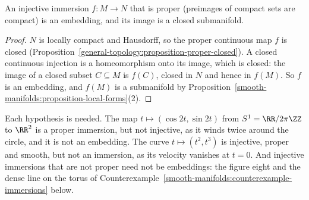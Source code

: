 \begin{proposition}\label{smooth-manifolds:proposition-proper-immersion}
An injective immersion $f \colon M \to N$ that is proper (preimages of compact sets are compact) is an embedding, and its image is a closed submanifold.
\end{proposition}

\begin{proof}
$N$ is locally compact and Hausdorff, so the proper continuous map $f$ is closed (Proposition~\ref{general-topology:proposition-proper-closed}). A closed continuous injection is a homeomorphism onto its
image, which is closed: the image of a closed subset $C \subseteq M$ is $f(C)$, closed in $N$ and hence in $f(M)$. So $f$ is an embedding, and $f(M)$ is a submanifold by
Proposition~\ref{smooth-manifolds:proposition-local-forms}(2).
\end{proof}

\begin{counterexample}\label{smooth-manifolds:counterexample-proper-immersion}
Each hypothesis is needed. The map $t \mapsto (\cos 2t, \sin 2t)$ from $S^1 = \RR/2\pi\ZZ$ to $\RR^2$ is a proper immersion, but not injective, as it winds twice around the circle, and it is not an
embedding. The curve $t \mapsto (t^2, t^3)$ is injective, proper and smooth, but not an immersion, as its velocity vanishes at $t = 0$. And injective immersions that are not proper need not be embeddings:
the figure eight and the dense line on the torus of Counterexample~\ref{smooth-manifolds:counterexample-immersions} below.
\end{counterexample}

